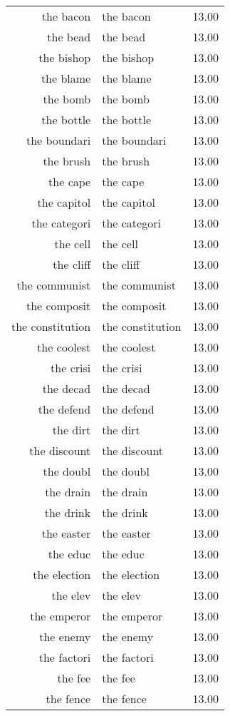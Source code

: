 \begin{table}[ht]
\begin{tabular}{rlr}
  the bacon & the bacon & 13.00 \\ 
  the bead & the bead & 13.00 \\ 
  the bishop & the bishop & 13.00 \\ 
  the blame & the blame & 13.00 \\ 
  the bomb & the bomb & 13.00 \\ 
  the bottle & the bottle & 13.00 \\ 
  the boundari & the boundari & 13.00 \\ 
  the brush & the brush & 13.00 \\ 
  the cape & the cape & 13.00 \\ 
  the capitol & the capitol & 13.00 \\ 
  the categori & the categori & 13.00 \\ 
  the cell & the cell & 13.00 \\ 
  the cliff & the cliff & 13.00 \\ 
  the communist & the communist & 13.00 \\ 
  the composit & the composit & 13.00 \\ 
  the constitution & the constitution & 13.00 \\ 
  the coolest & the coolest & 13.00 \\ 
  the crisi & the crisi & 13.00 \\ 
  the decad & the decad & 13.00 \\ 
  the defend & the defend & 13.00 \\ 
  the dirt & the dirt & 13.00 \\ 
  the discount & the discount & 13.00 \\ 
  the doubl & the doubl & 13.00 \\ 
  the drain & the drain & 13.00 \\ 
  the drink & the drink & 13.00 \\ 
  the easter & the easter & 13.00 \\ 
  the educ & the educ & 13.00 \\ 
  the election & the election & 13.00 \\ 
  the elev & the elev & 13.00 \\ 
  the emperor & the emperor & 13.00 \\ 
  the enemy & the enemy & 13.00 \\ 
  the factori & the factori & 13.00 \\ 
  the fee & the fee & 13.00 \\ 
  the fence & the fence & 13.00 \\ 

\end{tabular}
\end{table}
